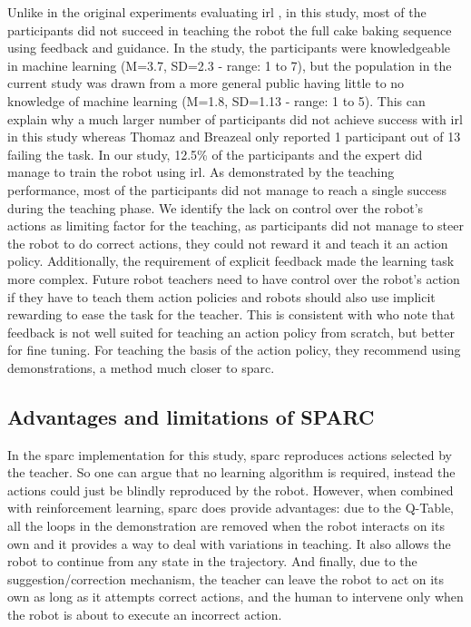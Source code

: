 Unlike in the original experiments evaluating \gls{irl} \citep{thomaz2008teachable}, in this study, most of the participants did not succeed in teaching the robot the full cake baking sequence using feedback and guidance. In the \citet{thomaz2008teachable} study, the participants were knowledgeable in machine learning (M=3.7, SD=2.3 - range: 1 to 7), but the population in the current study was drawn from a more general public having little to no knowledge of machine learning (M=1.8, SD=1.13 - range: 1 to 5). This can explain why a much larger number of participants did not achieve success with \gls{irl} in this study whereas Thomaz and Breazeal only reported 1 participant out of 13 failing the task. In our study, 12.5\% of the participants and the expert did manage to train the robot using \gls{irl}. As demonstrated by the teaching performance, most of the participants did not manage to reach a single success during the teaching phase. We identify the lack on control over the robot's actions as limiting factor for the teaching, as participants did not manage to steer the robot to do correct actions, they could not reward it and teach it an action policy. Additionally, the requirement of explicit feedback made the learning task more complex. Future robot teachers need to have control over the robot's action if they have to teach them action policies and robots should also use implicit rewarding to ease the task for the teacher. 
This is consistent with \cite{kaochar2011towards} who note that feedback is not well suited for teaching an action policy from scratch, but better for fine tuning. For teaching the basis of the action policy, they recommend using demonstrations, a method much closer to \gls{sparc}. 

\subsection{Advantages and limitations of SPARC}

In the \gls{sparc} implementation for this study, \gls{sparc} reproduces actions selected by the teacher. So one can argue that no learning algorithm is required, instead the actions could just be blindly reproduced by the robot. However, when combined with reinforcement learning, \gls{sparc} does provide advantages: due to the Q-Table, all the loops in the demonstration are removed when the robot interacts on its own and it provides a way to deal with variations in teaching. It also allows the robot to continue from any state in the trajectory. And finally, due to the suggestion/correction mechanism, the teacher can leave the robot to act on its own as long as it attempts correct actions, and the human to intervene only when the robot is about to execute an incorrect action. 

